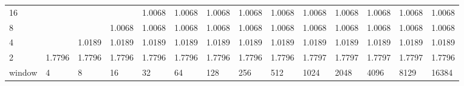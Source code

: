 \begin{table}[]
{\begin{tabular}{lrrrrrrrrrrrrr}
		\multicolumn{1}{|l|}{16} &  &  &  & \cellcolor[HTML]{99E600}1.0068 & \cellcolor[HTML]{99E600}1.0068 & \cellcolor[HTML]{99E600}1.0068 & \cellcolor[HTML]{99E600}1.0068 & \cellcolor[HTML]{99E600}1.0068 & \cellcolor[HTML]{99E600}1.0068 & \cellcolor[HTML]{99E600}1.0068 & \cellcolor[HTML]{99E600}1.0068 & \cellcolor[HTML]{99E600}1.0068 & \cellcolor[HTML]{99E600}1.0068 \\ \cline{1-1}
		\multicolumn{1}{|l|}{8} &  &  & \cellcolor[HTML]{99E600}1.0068 & \cellcolor[HTML]{99E600}1.0068 & \cellcolor[HTML]{99E600}1.0068 & \cellcolor[HTML]{99E600}1.0068 & \cellcolor[HTML]{99E600}1.0068 & \cellcolor[HTML]{99E600}1.0068 & \cellcolor[HTML]{99E600}1.0068 & \cellcolor[HTML]{99E600}1.0068 & \cellcolor[HTML]{99E600}1.0068 & \cellcolor[HTML]{99E600}1.0068 & \cellcolor[HTML]{99E600}1.0068 \\ \cline{1-1}
		\multicolumn{1}{|l|}{4} &  & \cellcolor[HTML]{99E600}1.0189 & \cellcolor[HTML]{99E600}1.0189 & \cellcolor[HTML]{99E600}1.0189 & \cellcolor[HTML]{99E600}1.0189 & \cellcolor[HTML]{99E600}1.0189 & \cellcolor[HTML]{99E600}1.0189 & \cellcolor[HTML]{99E600}1.0189 & \cellcolor[HTML]{99E600}1.0189 & \cellcolor[HTML]{99E600}1.0189 & \cellcolor[HTML]{99E600}1.0189 & \cellcolor[HTML]{99E600}1.0189 & \cellcolor[HTML]{99E600}1.0189 \\ \cline{1-1}
		\multicolumn{1}{|l|}{2} & \cellcolor[HTML]{4C00E6}1.7796 & \cellcolor[HTML]{4C00E6}1.7796 & \cellcolor[HTML]{4C00E6}1.7796 & \cellcolor[HTML]{4C00E6}1.7796 & \cellcolor[HTML]{4C00E6}1.7796 & \cellcolor[HTML]{4C00E6}1.7796 & \cellcolor[HTML]{4C00E6}1.7796 & \cellcolor[HTML]{4C00E6}1.7796 & \cellcolor[HTML]{4C00E6}1.7797 & \cellcolor[HTML]{4C00E6}1.7797 & \cellcolor[HTML]{4C00E6}1.7797 & \cellcolor[HTML]{4C00E6}1.7797 & \cellcolor[HTML]{4C00E6}1.7796 \\ \hline
		\multicolumn{1}{l|}{window} & \multicolumn{1}{l|}{4} & \multicolumn{1}{l|}{8} & \multicolumn{1}{l|}{16} & \multicolumn{1}{l|}{32} & \multicolumn{1}{l|}{64} & \multicolumn{1}{l|}{128} & \multicolumn{1}{l|}{256} & \multicolumn{1}{l|}{512} & \multicolumn{1}{l|}{1024} & \multicolumn{1}{l|}{2048} & \multicolumn{1}{l|}{4096} & \multicolumn{1}{l|}{8129} & \multicolumn{1}{l|}{16384} \\ \cline{2-14} 
	\end{tabular}
}
\end{table}
